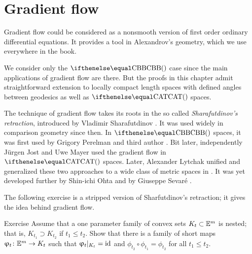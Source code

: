 \chapter{Gradient flow}\label{chap:grad}

Gradient flow could be considered as a nonsmooth version of first order ordinary differential equations.
It provides a tool in Alexandrov's geometry, 
which we use everywhere in the book.

We consider only the $\Alex{}{}$ case since the main applications of gradient flow are there.
But the proofs in this chapter admit straightforward extension to locally compact length spaces with defined angles between geodesics as well as $\CAT{}{}$ spaces.

The technique of gradient flow takes its roots in the so called \emph{Sharafutdinov's retraction}, 
introduced by Vladimir Sharafutdinov \cite{sharafutdinov}.
It was used  widely in comparison geometry since then.
In $\Alex{}$ spaces, it was first used by Grigory Perelman and third author \cite{perelman-petrunin:qg}.
Bit later, independently J\"urgen Jost and Uwe Mayer \cite{jost,mayer} 
used the gradient flow in $\CAT{}$ spaces.
Later, Alexander Lytchak unified and generalized these two approaches
to a wide class of metric spaces in \cite{lytchak:open-map}.
It was yet developed further by Shin-ichi Ohta \cite{ohta} and by Giuseppe Sevar\'e \cite{sevare}.

{\sloppy 
The following exercise is a stripped version of Sharfutdinov's retraction;
it gives the idea behind gradient flow.

}

\begin{thm}{Exercise}\label{ex:sharafutdinov}
Assume that a one parameter family of convex sets $K_t\subset \EE^m$ is nested; 
that is, $K_{t_1}\supset K_{t_2}$ if $t_1\le t_2$.
Show that there is a family of short maps $\phi_t\:\EE^m\to K_t$ 
such that $\upvarphi_t|_{K_t}=\mathop{\rm id}\nolimits$ and $\phi_{t_2}\circ\phi_{t_1}=\phi_{t_2}$ for all $t_1\le t_2$.
\end{thm}





















